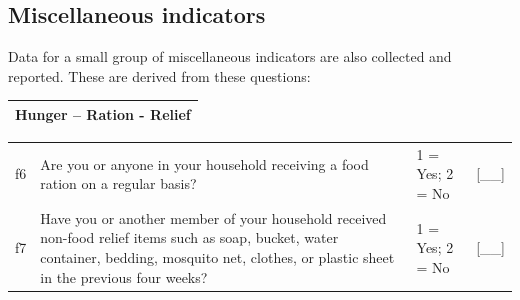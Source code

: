 \documentclass[12pt,a4paper]{book}
\theoremstyle{definition}
\theoremstyle{definition}
\theoremstyle{definition}
\theoremstyle{remark}
\begin{document}
\hypertarget{miscellaneous-indicators}{%
\subsection{Miscellaneous indicators}\label{miscellaneous-indicators}}

Data for a small group of miscellaneous indicators are also collected
and reported. These are derived from these questions:

\begin{longtable}[]{@{}c@{}}
\toprule
\begin{minipage}[t]{0.97\columnwidth}\centering
\textbf{Hunger -- Ration - Relief}\strut
\end{minipage}\tabularnewline
\bottomrule
\end{longtable}

\begin{longtable}[]{@{}llll@{}}
\toprule
\begin{minipage}[t]{0.09\columnwidth}\raggedright
f6\strut
\end{minipage} & \begin{minipage}[t]{0.41\columnwidth}\raggedright
Are you or anyone in your household receiving a food ration on a regular
basis?\strut
\end{minipage} & \begin{minipage}[t]{0.25\columnwidth}\raggedright
1 = Yes; 2 = No\strut
\end{minipage} & \begin{minipage}[t]{0.13\columnwidth}\raggedright
{[}\_\_{]}\strut
\end{minipage}\tabularnewline
\begin{minipage}[t]{0.09\columnwidth}\raggedright
f7\strut
\end{minipage} & \begin{minipage}[t]{0.41\columnwidth}\raggedright
Have you or another member of your household received non-food relief
items such as soap, bucket, water container, bedding, mosquito net,
clothes, or plastic sheet in the previous four weeks?\strut
\end{minipage} & \begin{minipage}[t]{0.25\columnwidth}\raggedright
1 = Yes; 2 = No\strut
\end{minipage} & \begin{minipage}[t]{0.13\columnwidth}\raggedright
{[}\_\_{]}\strut
\end{minipage}\tabularnewline
\bottomrule
\end{longtable}
\end{document}
